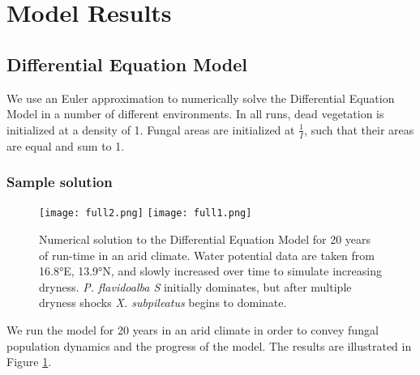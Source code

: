 \documentclass[12pt]{article}
\begin{document}


\section{Model Results}

\subsection{Differential Equation Model}
We use an Euler approximation to numerically solve the Differential Equation Model in a number of different environments. In all runs, dead vegetation is initialized at a density of 1. Fungal areas are initialized at $\frac{1}{I}$, such that their areas are equal and sum to 1.
\subsubsection{Sample solution}

\begin{figure}[!h]
 \centering
  \texttt{[image: full2.png]}
  \texttt{[image: full1.png]}
  \caption{Numerical solution to the Differential Equation Model for 20 years of run-time in an arid climate. Water potential data are taken from 16.8°E, 13.9°N, and slowly increased over time to simulate increasing dryness. \emph{P. flavidoalba S} initially dominates, but after multiple dryness shocks \emph{X. subpileatus} begins to dominate.}\label{fig:de_full}
 \end{figure}  

We run the model for 20 years in an arid climate in order to convey fungal population dynamics and the progress of the model. The results are illustrated in Figure \ref{fig:de_full}. 
\end{document}
